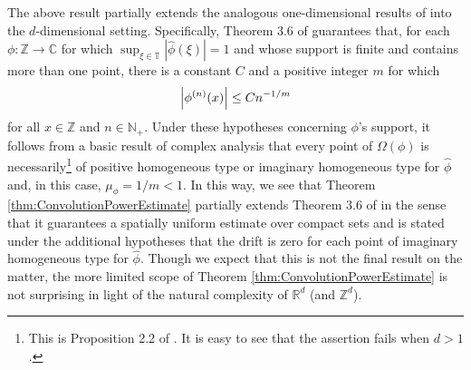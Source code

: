 \documentclass[11pt]{article}
\theoremstyle{remark}
\begin{document}
\noindent The above result partially extends the analogous one-dimensional results of \cite{randles_convolution_2015} into the $d$-dimensional setting. Specifically, Theorem 3.6 of \cite{randles_convolution_2015} guarantees that, for each $\phi:\mathbb{Z}\to\mathbb{C}$ for which $\sup_{\xi\in\mathbb{T}}|\widehat{\phi}(\xi)|=1$ and whose support is finite and contains more than one point, there is a constant $C$ and a positive integer $m$ for which
\begin{equation*}
    \abs{\phi^{(n)}(x)}\leq Cn^{-1/m}
\end{equation*}
for all $x\in\mathbb{Z}$ and $n\in\mathbb{N}_+$. Under these hypotheses concerning $\phi$'s support, it follows from a basic result of complex analysis that every point of $\Omega(\phi)$ is necessarily\footnote{This is Proposition 2.2 of \cite{randles_convolution_2015}. It is easy to see that the assertion fails when $d>1$.} of positive homogeneous type or imaginary homogeneous type for $\widehat{\phi}$ and, in this case, $\mu_\phi=1/m<1$. In this way, we see that Theorem \ref{thm:ConvolutionPowerEstimate} partially extends Theorem 3.6 of \cite{randles_convolution_2015} in the sense that it guarantees a spatially uniform estimate over compact sets and is stated under the additional hypotheses that the drift is zero for each point of imaginary homogeneous type for $\widehat{\phi}$. Though we expect that this is not the final result on the matter, the more limited scope of Theorem \ref{thm:ConvolutionPowerEstimate} is not surprising in light of the natural complexity of $\mathbb{R}^d$ (and $\mathbb{Z}^d$).\\
\end{document}
